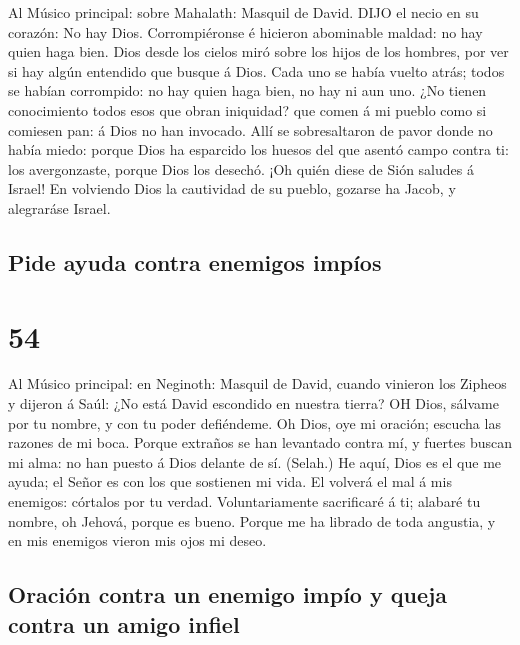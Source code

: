  Al Músico principal: sobre Mahalath: Masquil de David. DIJO
el necio en su corazón: No hay Dios. Corrompiéronse é hicieron
abominable maldad: no hay quien haga bien.  Dios desde los
cielos miró sobre los hijos de los hombres, por ver si hay algún
entendido que busque á Dios.  Cada uno se había vuelto
atrás; todos se habían corrompido: no hay quien haga bien, no hay ni aun
uno.  ¿No tienen conocimiento todos esos que obran
iniquidad? que comen á mi pueblo como si comiesen pan: á Dios no han
invocado.  Allí se sobresaltaron de pavor donde no había
miedo: porque Dios ha esparcido los huesos del que asentó campo contra
ti: los avergonzaste, porque Dios los desechó.  ¡Oh quién
diese de Sión saludes á Israel! En volviendo Dios la cautividad de su
pueblo, gozarse ha Jacob, y alegraráse Israel.

\hypertarget{pide-ayuda-contra-enemigos-impuxedos}{%
\subsection{Pide ayuda contra enemigos
impíos}\label{pide-ayuda-contra-enemigos-impuxedos}}

\hypertarget{section-53}{%
\section{54}\label{section-53}}

 Al Músico principal: en Neginoth: Masquil de David, cuando
vinieron los Zipheos y dijeron á Saúl: ¿No está David escondido en
nuestra tierra? OH Dios, sálvame por tu nombre, y con tu poder
defiéndeme.  Oh Dios, oye mi oración; escucha las razones de
mi boca.  Porque extraños se han levantado contra mí, y
fuertes buscan mi alma: no han puesto á Dios delante de sí. (Selah.)
 He aquí, Dios es el que me ayuda; el Señor es con los que
sostienen mi vida.  El volverá el mal á mis enemigos:
córtalos por tu verdad.  Voluntariamente sacrificaré á ti;
alabaré tu nombre, oh Jehová, porque es bueno.  Porque me ha
librado de toda angustia, y en mis enemigos vieron mis ojos mi deseo.

\hypertarget{oraciuxf3n-contra-un-enemigo-impuxedo-y-queja-contra-un-amigo-infiel}{%
\subsection{Oración contra un enemigo impío y queja contra un amigo
infiel}\label{oraciuxf3n-contra-un-enemigo-impuxedo-y-queja-contra-un-amigo-infiel}}

